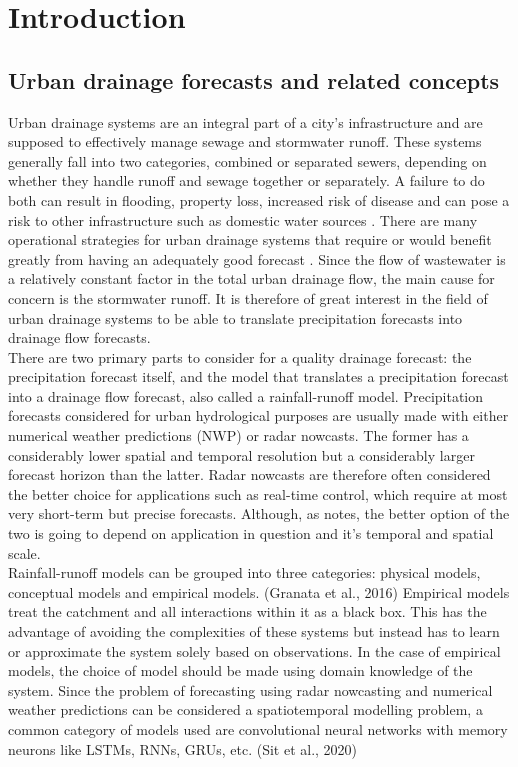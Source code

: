 \chapter{Introduction}

\section{Urban drainage forecasts and related concepts}
Urban drainage systems are an integral part of a city’s infrastructure and are supposed to effectively manage sewage and stormwater runoff. These systems generally fall into two categories, combined or separated sewers, depending on whether they handle runoff and sewage together or separately. A failure to do both can result in flooding, property loss, increased risk of disease and can pose a risk to other infrastructure such as domestic water sources \cite{RN284}. There are many operational strategies for urban drainage systems that require or would benefit greatly from having an adequately good forecast \cite{ThorndahlRadar}. Since the flow of wastewater is a relatively constant factor in the total urban drainage flow, the main cause for concern is the stormwater runoff. It is therefore of great interest in the field of urban drainage systems to be able to translate precipitation forecasts into drainage flow forecasts.\\
There are two primary parts to consider for a quality drainage forecast: the precipitation forecast itself, and the model that translates a precipitation forecast into a drainage flow forecast, also called a rainfall-runoff model. Precipitation forecasts considered for urban hydrological purposes are usually made with either numerical weather predictions (NWP) or radar nowcasts. The former has a considerably lower spatial and temporal resolution but a considerably larger forecast horizon than the latter. Radar nowcasts are therefore often considered the better choice for applications such as real-time control, which require at most very short-term but precise forecasts. Although, as \cite{jonasphd} notes, the better option of the two is going to depend on application in question and it’s temporal and spatial scale. \\
Rainfall-runoff models can be grouped into three categories: physical models, conceptual models and empirical models. (Granata et al., 2016) Empirical models treat the catchment and all interactions within it as a black box. This has the advantage of avoiding the complexities of these systems but instead has to learn or approximate the system solely based on observations. In the case of empirical models, the choice of model should be made using domain knowledge of the system. Since the problem of forecasting using radar nowcasting and numerical weather predictions can be considered a spatiotemporal modelling problem, a common category of models used are convolutional neural networks with memory neurons like LSTMs, RNNs, GRUs, etc. (Sit et al., 2020) \\

